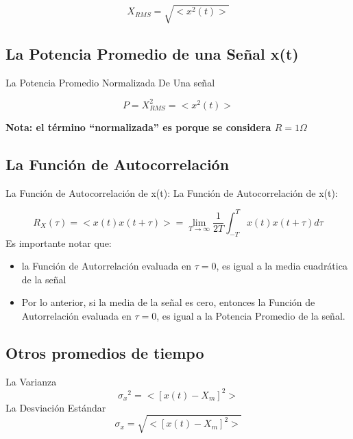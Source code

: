 	 \begin{equation} \label{equ_veintisiete}
	 	X_{RMS} = \sqrt{<x^{2}(t)>} 
	\end{equation}

\subsection{La Potencia Promedio de una Señal x(t)}

La Potencia Promedio Normalizada De Una señal

\begin{equation} \label{equ_veintiocho}
	 P = X_{RMS}^{2} = <x^{2}(t)> 
\end{equation} 


\textbf{Nota: el término “normalizada” es porque se considera $R=1 \Omega$}

\subsection{La Función de Autocorrelación}

La Función de Autocorrelación de x(t): La Función de Autocorrelación de x(t):

 \begin{equation} \label{equ_veintinueve}
	 R_{X}(\tau) = <x(t) x(t + \tau)> = \lim_{T \to \infty} \dfrac{1}{2T} \int_{-T}^{T} x(t) x(t + \tau) d\tau 
\end{equation}
Es importante notar que:
\begin{itemize}
    \item la Función de Autorrelación evaluada en $\tau =0$, es igual a la media cuadrática de la señal
    \item Por lo anterior, si la media de la señal es cero, entonces la Función de Autorrelación evaluada en $\tau =0$, es igual a la Potencia Promedio de la señal.
\end{itemize}    
\subsection{Otros promedios de tiempo}
La Varianza
\begin{equation} \label{equ_veintiocho}
	 {\sigma_x}^2= <[x(t)-X_m]^2>
\end{equation} 
La Desviación Estándar
\begin{equation} \label{equ_veintiocho}
	 \sigma_x= \sqrt{<[x(t)-X_m]^2>}
\end{equation} 

